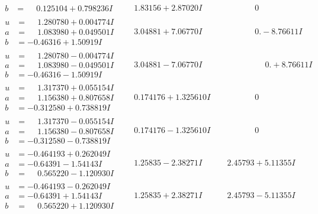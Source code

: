\documentclass[1p]{elsarticle_modified}
\theoremstyle{definition}
\begin{document}
$$\begin{array}{c|c|c}
\begin{aligned}
b &= \phantom{-}0.125104 + 0.798236 I\end{aligned}
 & \phantom{-}1.83156 + 2.87020 I & \phantom{-0.000000 } 0 \\ \hline\begin{aligned}
u &= \phantom{-}1.280780 + 0.004774 I \\
a &= \phantom{-}1.083980 + 0.049501 I \\
b &= -0.46316 + 1.50919 I\end{aligned}
 & \phantom{-}3.04881 + 7.06770 I & \phantom{-0.000000 } 0. - 8.76611 I \\ \hline\begin{aligned}
u &= \phantom{-}1.280780 - 0.004774 I \\
a &= \phantom{-}1.083980 - 0.049501 I \\
b &= -0.46316 - 1.50919 I\end{aligned}
 & \phantom{-}3.04881 - 7.06770 I & \phantom{-0.000000 -}0. + 8.76611 I \\ \hline\begin{aligned}
u &= \phantom{-}1.317370 + 0.055154 I \\
a &= \phantom{-}1.156380 + 0.807658 I \\
b &= -0.312580 + 0.738819 I\end{aligned}
 & \phantom{-}0.174176 + 1.325610 I & \phantom{-0.000000 } 0 \\ \hline\begin{aligned}
u &= \phantom{-}1.317370 - 0.055154 I \\
a &= \phantom{-}1.156380 - 0.807658 I \\
b &= -0.312580 - 0.738819 I\end{aligned}
 & \phantom{-}0.174176 - 1.325610 I & \phantom{-0.000000 } 0 \\ \hline\begin{aligned}
u &= -0.464193 + 0.262049 I \\
a &= -0.64391 - 1.54143 I \\
b &= \phantom{-}0.565220 - 1.120930 I\end{aligned}
 & \phantom{-}1.25835 - 2.38271 I & \phantom{-}2.45793 + 5.11355 I \\ \hline\begin{aligned}
u &= -0.464193 - 0.262049 I \\
a &= -0.64391 + 1.54143 I \\
b &= \phantom{-}0.565220 + 1.120930 I\end{aligned}
 & \phantom{-}1.25835 + 2.38271 I & \phantom{-}2.45793 - 5.11355 I \\ \hline\begin{aligned}

\end{aligned}
\end{array}$$
\end{document}
